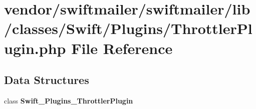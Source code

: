 \section{vendor/swiftmailer/swiftmailer/lib/classes/\+Swift/\+Plugins/\+Throttler\+Plugin.php File Reference}
\label{_throttler_plugin_8php}
\subsection*{Data Structures}
\begin{DoxyCompactItemize}
\item 
class {\bf Swift\+\_\+\+Plugins\+\_\+\+Throttler\+Plugin}
\end{DoxyCompactItemize}
